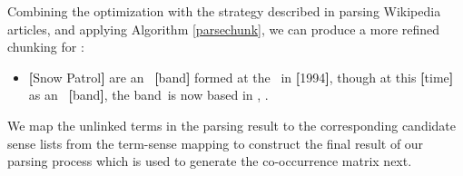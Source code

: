 Combining the optimization with the strategy described in parsing Wikipedia articles, and
applying Algorithm \ref{parsechunk}, we can produce a more refined chunking for :
%
\begin{itemize}
\item {\textbf{[}Snow Patrol\textbf{]}} are an
\rbb\ {\textbf{[}band\textbf{]}} formed at the \rbb\ in
{\textbf{[}1994\textbf{]}}, though at this {\textbf{[}time\textbf{]}} as an
\rbb\ {\textbf{[}band\textbf{]}}, the
\lbb band\rbb\ is now based in \rbb,
\rbb.
\end{itemize}

We map the unlinked terms in the parsing result to
the corresponding candidate sense lists
from the term-sense mapping to construct the final result
of our parsing process which is used to generate the
co-occurrence matrix next.


